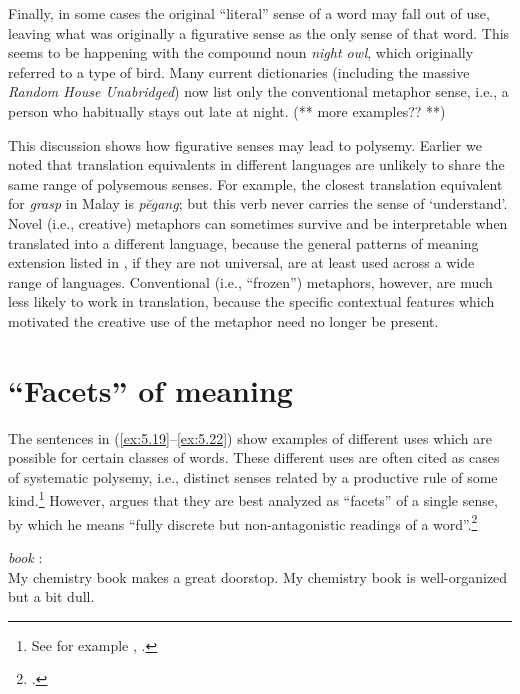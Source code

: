 Finally, in some cases the original “literal” sense of a word may fall out of use, leaving what was originally a figurative sense as the only sense of that word. This seems to be happening with the compound noun \textit{night owl}, which originally referred to a type of bird. Many current dictionaries (including the massive \textit{Random House Unabridged}) now list only the conventional metaphor sense, i.e., a person who habitually stays out late at night. (** more examples?? **)



This discussion shows how figurative senses may lead to polysemy. Earlier we noted that translation equivalents in different languages are unlikely to share the same range of polysemous senses. For example, the closest translation equivalent for \textit{grasp} in Malay is \textit{pĕgang}; but this verb never carries the sense of ‘understand’. Novel (i.e., creative) metaphors can sometimes survive and be interpretable when translated into a different language, because the general patterns of meaning extension listed in , if they are not universal, are at least used across a wide range of languages. Conventional (i.e., “frozen”) metaphors, however, are much less likely to work in translation, because the specific contextual features which motivated the creative use of the metaphor need no longer be present. 


\section{“Facets” of meaning}\label{sec:5.5}

The sentences in (\ref{ex:5.19}--\ref{ex:5.22}) show examples of different uses which are possible for certain classes of words. These different uses are often cited as cases of systematic polysemy, i.e., distinct senses related by a productive rule of some kind.\footnote{See for example \citet{Pustejovsky1995}, \citet{NunbergZaenen1992}.} However, \citet{Cruse2000,Cruse2004} argues that they are best analyzed as “facets” of a single sense, by which he means “fully discrete but non-antagonistic readings of a word”.\footnote{\citet[116]{Cruse2000}.}

\settowidth{}
\ea  \label{ex:5.19}
\textit{book} \citep{Cruse2004}:\\
\ea My chemistry book makes a great doorstop.            
\ex My chemistry book is well-organized but a bit dull.  
                       \z
\z

